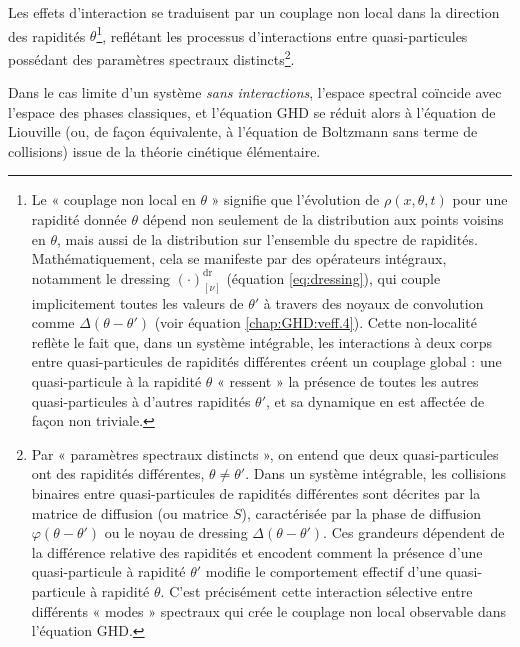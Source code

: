 Les effets d'interaction se traduisent par un couplage non local dans la direction des rapidités $\theta$\footnote{Le « couplage non local en $\theta$ » signifie que l'évolution de $\rho(x,\theta,t)$ pour une rapidité donnée $\theta$ dépend non seulement de la distribution aux points voisins en $\theta$, mais aussi de la distribution sur l'ensemble du spectre de rapidités. Mathématiquement, cela se manifeste par des opérateurs intégraux, notamment le dressing $(\cdot)^{\mathrm{dr}}_{[\nu]}$ (équation \eqref{eq:dressing}), qui couple implicitement toutes les valeurs de $\theta'$ à travers des noyaux de convolution comme $\Delta(\theta-\theta')$ (voir équation \eqref{chap:GHD:veff.4}). Cette non-localité reflète le fait que, dans un système intégrable, les interactions à deux corps entre quasi-particules de rapidités différentes créent un couplage global : une quasi-particule à la rapidité $\theta$ « ressent » la présence de toutes les autres quasi-particules à d'autres rapidités $\theta'$, et sa dynamique en est affectée de façon non triviale.}, reflétant les processus d'interactions entre quasi-particules possédant des paramètres spectraux distincts\footnote{Par « paramètres spectraux distincts », on entend que deux quasi-particules ont des rapidités différentes, $\theta \neq \theta'$. Dans un système intégrable, les collisions binaires entre quasi-particules de rapidités différentes sont décrites par la matrice de diffusion (ou matrice $S$), caractérisée par la phase de diffusion $\varphi(\theta - \theta')$ ou le noyau de dressing $\Delta(\theta-\theta')$. Ces grandeurs dépendent de la différence relative des rapidités et encodent comment la présence d'une quasi-particule à rapidité $\theta'$ modifie le comportement effectif d'une quasi-particule à rapidité $\theta$. C'est précisément cette interaction sélective entre différents « modes » spectraux qui crée le couplage non local observable dans l'équation \gls{GHD}.}.

\medskip

Dans le cas limite d’un système \emph{sans interactions}, l’espace spectral coïncide avec l’espace des phases classiques, et l’équation \gls{GHD} se réduit alors à l’équation de Liouville (ou, de façon équivalente, à l’équation de Boltzmann sans terme de collisions) issue de la théorie cinétique élémentaire.

\medskip

